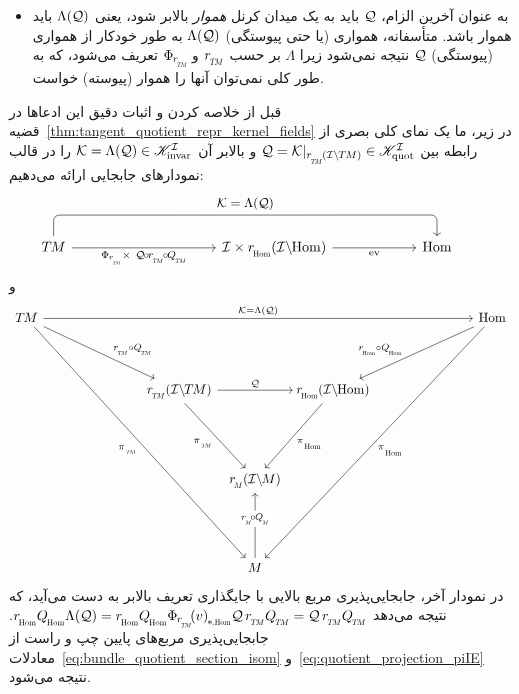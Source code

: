 \begin{itemize}[leftmargin=0.6cm]
\item[{\rule[2.4pt]{2pt}{2pt}}]
به عنوان آخرین الزام، $\mathcal{Q}$ باید به یک میدان کرنل \emph{هموار} بالابر شود، یعنی $\Lambda(\mathcal{Q})$ باید هموار باشد.
متأسفانه، همواری (یا حتی پیوستگی) $\Lambda(\mathcal{Q})$ به طور خودکار از همواری (پیوستگی) $\mathcal{Q}$ نتیجه نمی‌شود زیرا $\Lambda$ بر حسب $\rTM$ و $\PhirNoArg$ تعریف می‌شود، که به طور کلی نمی‌توان آنها را هموار (پیوسته) خواست.

\end{itemize}


قبل از خلاصه کردن و اثبات دقیق این ادعاها در قضیه~\ref{thm:tangent_quotient_repr_kernel_fields} در زیر، ما یک نمای کلی بصری از رابطه بین $\Q = \Krestr \in \KIquot$ و بالابر آن $\mathcal{K} = \Lambda(\mathcal{Q}) \in \mathscr{K}_\textup{invar}^{\mathcal{I}}$ را در قالب نمودارهای جابجایی ارائه می‌دهیم:
\begin{equation}
    \begin{tikzcd}[row sep=3.5em, column sep=6em]
        \TM
            \arrow[r, "\PhirNoArg \,\times\ \Q \mkern-2mu\circ\mkern-2mu \rTM \mkern-2mu\circ\mkern-2mu \QTM"']
            \arrow[rr, rounded corners, to path={ 
                    -- ([yshift=+3.5ex]\tikztostart.north) 
                    --node[above, pos=.5]{\small$\K = \Lambda(\Q)$} ([yshift=+3.5ex]\tikztotarget.north) 
                    -- (\tikztotarget.north)
                    }]
        &[10ex]
        \I \times \rHom(\IHom)
            \arrow[r, "\ev"']
        & \Hom
    \end{tikzcd}
    \qquad
\end{equation}
و
\begin{equation}
    \begin{tikzcd}[row sep=5em, column sep=7.5em]
        \TM
            \arrow[rd, pos=.6, "\rTM\circ\QTM"]
            \arrow[rrddd, "\piTM"']
            \arrow[rrrr, "\K = \Lambda(\Q)"]
        & &[-7em] &[-7em] &
        \Hom
            \arrow[ld, pos=.6, "\rHom\circ\QHom"']
            \arrow[llddd, "\piHom"]
        \\[-1em]
        & \rTM(\ITM)
            \arrow[rr, "\Q"]
            \arrow[rd, start anchor={[xshift=-1ex]}, "\piTM"']
        & &
        \mkern-3mu
        \rHom(\IHom)
            \arrow[ld, "\piHom"]
        \\
        & &
        \rM(\IM)
        \\
        & &
        M
            \arrow[u, pos=.6, "\rM \!\circ\mkern-1mu \QM"' description]
    \end{tikzcd}
\end{equation}
در نمودار آخر، جابجایی‌پذیری مربع بالایی با جایگذاری تعریف بالابر به دست می‌آید، که نتیجه می‌دهد
$\rHom\QHom \Lambda(\Q) = \rHom\QHom \dPhirHom{v} \Q\, \rTM\QTM = \Q\, \rTM\QTM$.
جابجایی‌پذیری مربع‌های پایین چپ و راست از معادلات~\ref{eq:bundle_quotient_section_isom} و~\ref{eq:quotient_projection_piIE} نتیجه می‌شود.


